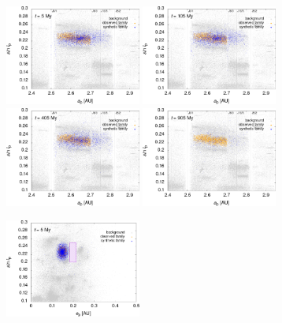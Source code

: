 \documentclass{beamer}
\newlength{\vyska}
\newlength{\vyskaB}
\newlength{\main}
\begin{document}
\begin{frame}
\begin{columns}[t]
\begin{column}{\main}
\begin{tcolorbox}[title=Výsledky\phantom{Úy},height=\vyskaB]
\begin{figure}[t]
\begin{subfigure}[t]{0.33\textwidth}
			\centering
			\includegraphics[width=0.49\textwidth]{../obr/ai_5t_trans.png}
			\includegraphics[width=0.49\textwidth]{../obr/ai_105t_trans.png}\\
			\includegraphics[width=0.49\textwidth]{../obr/ai_405t_trans.png}
			\includegraphics[width=0.49\textwidth]{../obr/ai_905t_trans.png}
		\end{subfigure}
		\begin{subfigure}[t]{0.33\textwidth}
			\centering
			\includegraphics[width=0.49\textwidth]{../obr/ei_5t_trans.png}

\end{subfigure}
\end{figure}
\end{tcolorbox}
\end{column}
\end{columns}
\end{frame}
\end{document}
